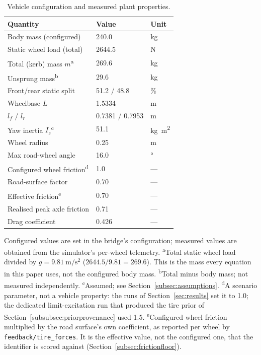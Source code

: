 \begin{table}[t]
\caption{Vehicle configuration and measured plant properties.}
\label{tab:vehicle}
\centering
\footnotesize
\setlength{\tabcolsep}{4pt}
\begin{tabular}{@{}lll@{}}
\toprule
Quantity  & Value & Unit\\
\midrule
Body mass (configured) & 240.0 & \si{\kilo\gram}\\
Static wheel load (total)      & 2644.5 & \si{\newton}\\
Total (kerb) mass $m$\textsuperscript{a} & 269.6 & \si{\kilo\gram}\\
Unsprung mass\textsuperscript{b} & 29.6 & \si{\kilo\gram}\\
Front/rear static split        & 51.2 / 48.8 & \si{\percent}\\
Wheelbase $L$                  & 1.5334 & \si{\meter}\\
$l_{f}$ / $l_{r}$              & 0.7381 / 0.7953 & \si{\meter}\\
Yaw inertia $I_{z}$\textsuperscript{c} & 51.1 & \si{\kilo\gram\meter\squared}\\
Wheel radius                   & 0.25 & \si{\meter}\\
Max road-wheel angle           & 16.0 & \si{\degree}\\
Configured wheel friction\textsuperscript{d} & 1.0 & ---\\
Road-surface factor & 0.70 & ---\\
Effective friction\textsuperscript{e} & 0.70 & ---\\
Realised peak axle friction    & 0.71 & ---\\
Drag coefficient               & 0.426 & ---\\
\bottomrule
\end{tabular}

\vspace{2pt}
{\raggedright\footnotesize Configured values are set in the bridge's
configuration; measured values are obtained
from the simulator's per-wheel telemetry.
\textsuperscript{a}Total static wheel load divided by
$g=\SI{9.81}{\meter\per\second\squared}$ ($\num{2644.5}/\num{9.81}=\num{269.6}$). This is the mass every equation in this paper uses, not the configured
body mass. \textsuperscript{b}Total minus body mass; not measured
independently. \textsuperscript{c}Assumed; see
Section~\ref{subsec:assumptions}. \textsuperscript{d}A scenario parameter, not
a vehicle property: the runs of Section~\ref{sec:results} set it to \num{1.0};
the dedicated limit-excitation run that produced the tire prior of
Section~\ref{subsubsec:priorprovenance} used \num{1.5}.
\textsuperscript{e}Configured wheel friction
multiplied by the road surface's own coefficient, as reported per wheel by
\texttt{feedback/\allowbreak tire\_forces}. It is the effective value, not the
configured one, that the identifier is scored against
(Section~\ref{subsec:frictionfloor}).\par}
\end{table}

